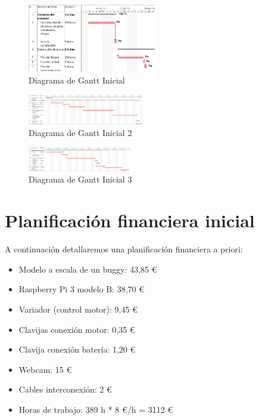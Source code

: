 \documentclass{pclass}
\begin{document}
\begin{figure}[H]
  \centering
    \includegraphics[angle=270,width=0.5\textwidth]{img/ganttInicial}
  \caption{Diagrama de Gantt Inicial}
  \label{fig:ganttInicial}
\end{figure}

\begin{figure}[H]
	\centering
	\includegraphics[angle=270,width=0.45\textwidth]{img/ganttInicial_2}
	\caption{Diagrama de Gantt Inicial 2}
	\label{fig:ganttInicial2}
\end{figure}

\begin{figure}[H]
	\centering
	\includegraphics[angle=270,width=0.40\textwidth]{img/ganttInicial_3}
	\caption{Diagrama de Gantt Inicial 3}
	\label{fig:ganttInicial3}
\end{figure}



\section{Planificación financiera inicial} 
A continuación detallaremos una planificación financiera a priori:
\begin{itemize}
    \item Modelo a escala de un buggy: 43,85 \euro
    \item Raspberry Pi 3 modelo B: 38,70 \euro
    \item Variador (control motor): 9,45 \euro
    \item Clavijas conexión motor: 0,35 \euro
    \item Clavija conexión batería: 1,20 \euro
    \item Webcam: 15 \euro
    \item Cables interconexión: 2 \euro
    \item Horas de trabajo: 389 h * 8 \euro/h = 3112 \euro

\end{itemize}
\end{document}
